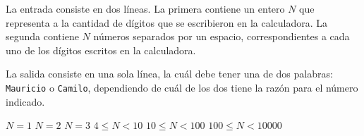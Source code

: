 \documentclass{oci}
\begin{document}
\begin{inputDescription}
  La entrada consiste en dos líneas.
  La primera contiene un entero $N$ que representa a la cantidad de dígitos que
  se escribieron en la calculadora.
  La segunda contiene $N$ números separados por un espacio, correspondientes a
  cada uno de los dígitos escritos en la calculadora.
\end{inputDescription}

\begin{outputDescription}
La salida consiste en una sola línea, la cuál debe tener una de dos palabras:
\texttt{Mauricio} o \texttt{Camilo}, dependiendo de cuál de los dos tiene la
razón para el número indicado.
\end{outputDescription}

\begin{scoreDescription}
   $ N = 1$
   $ N = 2$
   $ N = 3$
   $ 4 \leq N < 10$
   $ 10 \leq N < 100$
   $ 100 \leq N < 10000$
\end{scoreDescription}

\begin{sampleDescription}
\end{sampleDescription}
\end{document}
